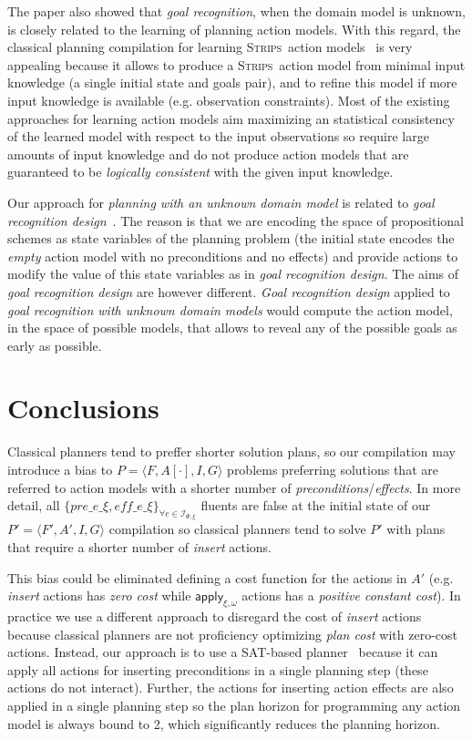 \documentclass[letterpaper]{article} %
\newcommand{\tup}[1]{{\langle #1 \rangle}}
\newcommand{\strips}{\textsc{Strips}}     %
\begin{document}
The paper also showed that {\em goal recognition}, when the domain model is unknown, is closely related to the learning of planning action models. With this regard, the classical planning compilation for learning \strips\ action models~\cite{aineto2018learning} is very appealing because it allows to produce a \strips\ action model from minimal input knowledge (a single initial state and goals pair), and to refine this model if more input knowledge is available (e.g. observation constraints). Most of the existing approaches for learning action models aim maximizing an statistical consistency of the learned model with respect to the input observations so require large amounts of input knowledge and do not produce action models that are guaranteed to be {\em logically consistent} with the given input knowledge.

Our approach for {\em planning with an unknown domain model} is related to {\em goal recognition design}~\cite{KerenGK14}. The reason is that we are encoding the space of propositional schemes as state variables of the planning problem (the initial state encodes the {\em empty} action model with no preconditions and no effects) and provide actions to modify the value of this state variables as in {\em goal recognition design}. The aims of {\em goal recognition design} are however different. {\em Goal recognition design} applied to {\em goal recognition with unknown domain models} would compute the action model, in the space of possible models, that allows to reveal any of the possible goals as early as possible.



\section{Conclusions}
\label{sec:conclusions}
Classical planners tend to preffer shorter solution plans, so our compilation may introduce a bias to $P=\tup{F,A[\cdot],I,G}$ problems preferring solutions that are referred to action models with a shorter number of {\em preconditions}/{\em effects}. In more detail, all $\{pre\_e\_\xi, eff\_e\_\xi\}_{\forall e\in{\mathcal I}_{\Psi,\xi}}$ fluents are false at the initial state of our $P'=\tup{F',A',I,G}$ compilation so classical planners tend to solve $P'$ with plans that require a shorter number of {\em insert} actions.

This bias could be eliminated defining a cost function for the actions in $A'$ (e.g. {\em insert} actions has {\em zero cost} while $\mathsf{apply_{\xi,\omega}}$ actions has a {\em positive constant cost}). In practice we use a different approach to disregard the cost of {\em insert} actions because classical planners are not proficiency optimizing {\em plan cost} with zero-cost actions. Instead, our approach is to use a SAT-based planner~\cite{rintanen2014madagascar} because it can apply all actions for inserting preconditions in a single planning step (these actions do not interact). Further, the actions for inserting action effects are also applied in a single planning step so the plan horizon for programming any action model is always bound to 2, which significantly reduces the planning horizon.
\end{document}
